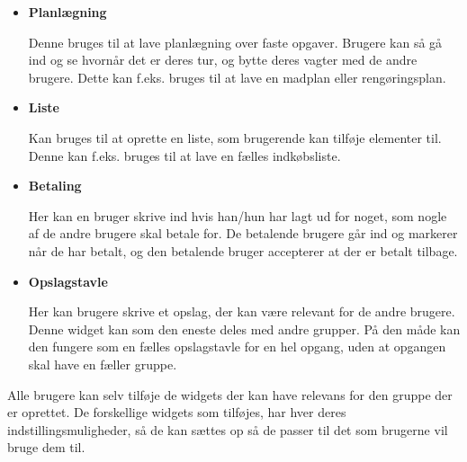\begin{itemize}
\item  \textbf{Planlægning}

Denne bruges til at lave planlægning over faste opgaver. Brugere kan så gå ind og se hvornår det er deres tur, og bytte deres vagter med de andre brugere. Dette kan f.eks. bruges til at lave en madplan eller rengøringsplan.
\end{itemize}

\begin{itemize}
\item  \textbf{Liste}

\noindent Kan bruges til at oprette en liste, som brugerende kan tilføje elementer til. Denne kan f.eks. bruges til at lave en fælles indkøbsliste.
\end{itemize}

\begin{itemize}
\item  \textbf{Betaling}

\noindent Her kan en bruger skrive ind hvis han/hun har lagt ud for noget, som nogle af de andre brugere skal betale for. De betalende brugere går ind og markerer når de har betalt, og den betalende bruger accepterer at der er betalt tilbage.
\end{itemize}

\begin{itemize}
\item  \textbf{Opslagstavle}

\noindent Her kan brugere skrive et opslag, der kan være relevant for de andre brugere. Denne widget kan som den eneste deles med andre grupper. På den måde kan den fungere som en fælles opslagstavle for en hel opgang, uden at opgangen skal have en fæller gruppe.
\end{itemize}
\noindent Alle brugere kan selv tilføje de widgets der kan have relevans for den gruppe der er oprettet. De forskellige widgets som tilføjes, har hver deres indstillingsmuligheder, så de kan sættes op så de passer til det som brugerne vil bruge dem til. 

